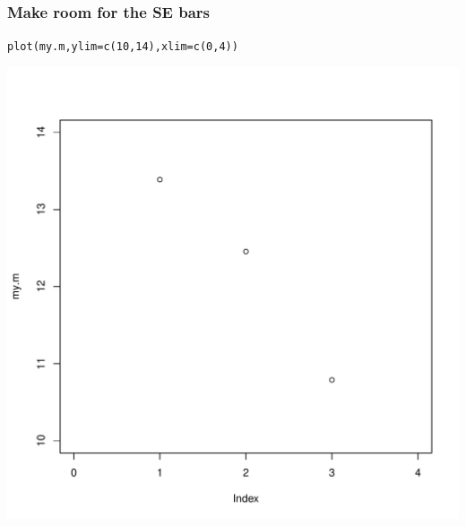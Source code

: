 \documentclass{beamer}\usepackage[]{graphicx}\usepackage[]{color}
\makeatletter
\newcommand{\hlnum}[1]{\textcolor[rgb]{0.533,0,0.133}{#1}}%
\newcommand{\hlstd}[1]{\textcolor[rgb]{0,0,0}{#1}}%
\newcommand{\hlkwc}[1]{\textcolor[rgb]{0,0,0.4}{#1}}%
\newcommand{\hlkwd}[1]{\textcolor[rgb]{0,0.267,0.4}{#1}}%
\newenvironment{kframe}{%
 \def\at@end@of@kframe{}%
 \ifinner\ifhmode%
  \def\at@end@of@kframe{\end{minipage}}%
  \begin{minipage}{\columnwidth}%
 \fi\fi%
 \def\FrameCommand##1{\hskip\@totalleftmargin \hskip-\fboxsep
 \colorbox{shadecolor}{##1}\hskip-\fboxsep
     \hskip-\linewidth \hskip-\@totalleftmargin \hskip\columnwidth}%
 \MakeFramed {\advance\hsize-\width
   \@totalleftmargin\z@ \linewidth\hsize
   \@setminipage}}%
 {\par\unskip\endMakeFramed%
 \at@end@of@kframe}
\newenvironment{knitrout}{}{} %
\makeatother
\begin{document}
\begin{frame}[fragile]
  \frametitle{Make room for the SE bars}
\begin{knitrout}
\color{fgcolor}\begin{kframe}
\begin{alltt}
\hlkwd{plot}\hlstd{(my.m,} \hlkwc{ylim} \hlstd{=} \hlkwd{c}\hlstd{(}\hlnum{10}\hlstd{,} \hlnum{14}\hlstd{),} \hlkwc{xlim} \hlstd{=} \hlkwd{c}\hlstd{(}\hlnum{0}\hlstd{,} \hlnum{4}\hlstd{))}
\end{alltt}
\end{kframe}

{\centering \includegraphics[width=0.6\linewidth]{figure/m2-1} 

}



\end{knitrout}
\end{frame}
\end{document}
